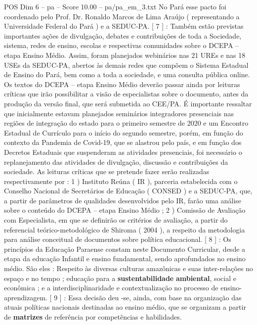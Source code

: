 \begin{textsample}{POS Dim 6 – pa – Score 10.00 – pa/pa\_em\_3.txt}
No Pará esse pacto foi coordenado pelo Prof.
Dr.
Ronaldo Marcos de Lima Araújo ( representando a Universidade Federal do Pará ) e a SEDUC-PA. [ 7 ] : Também estão previstas importantes ações de divulgação, debates e contribuições de toda a Sociedade, sistema, redes de ensino, escolas e respectivas comunidades sobre o DCEPA – etapa Ensino Médio.
Assim, foram planejados webinários nas 21 UREs e nas 18 USEs da SEDUC-PA, abertos às demais redes que compõem o Sistema Estadual de Ensino do Pará, bem como a toda a sociedade, e uma consulta pública online.
Os textos do DCEPA – etapa Ensino Médio deverão passar ainda por leituras críticas que irão possibilitar a visão de especialistas sobre o documento, antes da produção da versão final, que será submetida ao CEE/PA.
É importante ressaltar que inicialmente estavam planejados seminários integradores presenciais nas regiões de integração do estado para o primeiro semestre de 2020 e um Encontro Estadual de Currículo para o início do segundo semestre, porém, em função do contexto da Pandemia de Covid-19, que se alastrou pelo país, e em função dos Decretos Estaduais que suspenderam as atividades presenciais, foi necessário o replanejamento das atividades de divulgação, discussão e contribuições da sociedade.
As leituras críticas que se pretende fazer serão realizadas respectivamente por : 1 ) Instituto Reúna ( IR ), parceria estabelecida com o Conselho Nacional de Secretários de Educação ( CONSED ) e a SEDUC-PA, que, a partir de parâmetros de qualidades desenvolvidos pelo IR, farão uma análise sobre o conteúdo do DCEPA – etapa Ensino Médio ; 2 ) Comissão de Avaliação com Especialista, em que se definirão os critérios de avaliação, a partir do referencial teórico-metodológico de Shiroma ( 2004 ), a respeito da metodologia para análise conceitual de documentos sobre política educacional. [ 8 ] : Os princípios da Educação Paraense constam neste Documento Curricular, desde a etapa da educação Infantil e ensino fundamental, sendo aprofundados no ensino médio.
São eles : Respeito às diversas culturas amazônicas e suas inter-relações no espaço e no tempo ; educação para a \textbf{sustentabilidade} \textbf{ambiental}, social e econômica ; e a interdisciplinaridade e contextualização no processo de ensino-aprendizagem. [ 9 ] : Essa decisão deu -se, ainda, com base na organização das atuais políticas nacionais destinadas ao ensino médio, que se organizam a partir de \textbf{matrizes} de referência por competências e habilidades.

\end{textsample}
